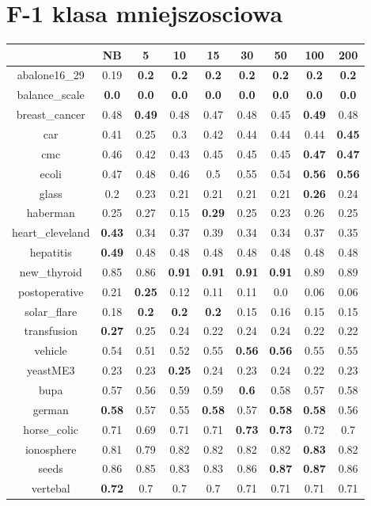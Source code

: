 \documentclass{article}%
\begin{document}
%
\section*{F{-}1 klasa mniejszosciowa}%
\begin{tabular}{c|cccccccc}%
\hline%
&NB&5&10&15&30&50&100&200\\%
\hline%
abalone16\_29&0.19&\textbf{0.2}&\textbf{0.2}&\textbf{0.2}&\textbf{0.2}&\textbf{0.2}&\textbf{0.2}&\textbf{0.2}\\%
\hline%
balance\_scale&\textbf{0.0}&\textbf{0.0}&\textbf{0.0}&\textbf{0.0}&\textbf{0.0}&\textbf{0.0}&\textbf{0.0}&\textbf{0.0}\\%
\hline%
breast\_cancer&0.48&\textbf{0.49}&0.48&0.47&0.48&0.45&\textbf{0.49}&0.48\\%
\hline%
car&0.41&0.25&0.3&0.42&0.44&0.44&0.44&\textbf{0.45}\\%
\hline%
cmc&0.46&0.42&0.43&0.45&0.45&0.45&\textbf{0.47}&\textbf{0.47}\\%
\hline%
ecoli&0.47&0.48&0.46&0.5&0.55&0.54&\textbf{0.56}&\textbf{0.56}\\%
\hline%
glass&0.2&0.23&0.21&0.21&0.21&0.21&\textbf{0.26}&0.24\\%
\hline%
haberman&0.25&0.27&0.15&\textbf{0.29}&0.25&0.23&0.26&0.25\\%
\hline%
heart\_cleveland&\textbf{0.43}&0.34&0.37&0.39&0.34&0.34&0.37&0.35\\%
\hline%
hepatitis&\textbf{0.49}&0.48&0.48&0.48&0.48&0.48&0.48&0.48\\%
\hline%
new\_thyroid&0.85&0.86&\textbf{0.91}&\textbf{0.91}&\textbf{0.91}&\textbf{0.91}&0.89&0.89\\%
\hline%
postoperative&0.21&\textbf{0.25}&0.12&0.11&0.11&0.0&0.06&0.06\\%
\hline%
solar\_flare&0.18&\textbf{0.2}&\textbf{0.2}&\textbf{0.2}&0.15&0.16&0.15&0.15\\%
\hline%
transfusion&\textbf{0.27}&0.25&0.24&0.22&0.24&0.24&0.22&0.22\\%
\hline%
vehicle&0.54&0.51&0.52&0.55&\textbf{0.56}&\textbf{0.56}&0.55&0.55\\%
\hline%
yeastME3&0.23&0.23&\textbf{0.25}&0.24&0.23&0.24&0.22&0.23\\%
\hline%
bupa&0.57&0.56&0.59&0.59&\textbf{0.6}&0.58&0.57&0.58\\%
\hline%
german&\textbf{0.58}&0.57&0.55&\textbf{0.58}&0.57&\textbf{0.58}&\textbf{0.58}&0.56\\%
\hline%
horse\_colic&0.71&0.69&0.71&0.71&\textbf{0.73}&\textbf{0.73}&0.72&0.7\\%
\hline%
ionosphere&0.81&0.79&0.82&0.82&0.82&0.82&\textbf{0.83}&0.82\\%
\hline%
seeds&0.86&0.85&0.83&0.83&0.86&\textbf{0.87}&\textbf{0.87}&0.86\\%
\hline%
vertebal&\textbf{0.72}&0.7&0.7&0.7&0.71&0.71&0.71&0.71\\%
\hline%
\end{tabular}
\end{document}
